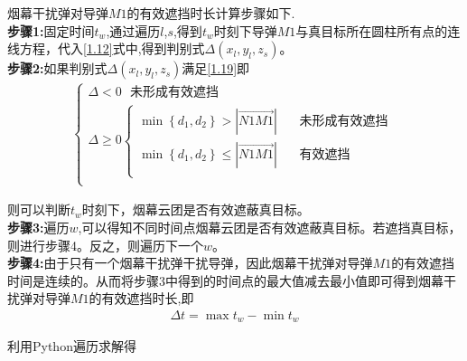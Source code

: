 \documentclass[../main.tex]{subfiles}
\begin{document}
  
烟幕干扰弹对导弹$M1$的有效遮挡时长计算步骤如下.
\\
\textbf{步骤1:}固定时间$t_w$,通过遍历$l$,$s$,得到$t_w$时刻下导弹$M1$与真目标所在圆柱所有点的连线方程，代入\eqref{1.12}式中,得到判别式$\Delta \left( x_l,y_l,z_s \right)$。
\\
\textbf{步骤2:}如果判别式$\Delta \left( x_l,y_l,z_s \right)$满足\eqref{1.19}即
\begin{align}\label{1.19}
	\left\{ \begin{array}{l}
	\varDelta <0\ \ \ \text{未形成有效遮挡}\\
	\varDelta \ge 0\left\{ \begin{array}{l}
	\min \left\{ d_1,d_2 \right\} >\left| \overrightarrow{N1M1} \right|\ \ \ \ \ \ \ \ \text{未形成有效遮挡}\\
	\min \left\{ d_1,d_2 \right\} \le \left| \overrightarrow{N1M1} \right|\ \ \ \ \ \ \ \ \text{有效遮挡}\\
\end{array} \right.\\
\end{array} \right. 
\end{align}
\par 则可以判断$t_w$时刻下，烟幕云团是否有效遮蔽真目标。
\\
\textbf{步骤3:}遍历$w$,可以得知不同时间点烟幕云团是否有效遮蔽真目标。若遮挡真目标，则进行步骤4。反之，则遍历下一个$w$。
\\
\textbf{步骤4:}由于只有一个烟幕干扰弹干扰导弹，因此烟幕干扰弹对导弹$M1$的有效遮挡时间是连续的。从而将步骤3中得到的时间点的最大值减去最小值即可得到烟幕干扰弹对导弹$M1$的有效遮挡时长,即
\begin{align}\label{1.189}
	\varDelta t=\max t_w-\min t_w
\end{align}

利用Python遍历求解得
\end{document}

